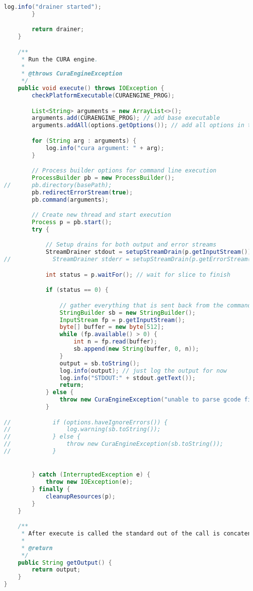 \begin{lstlisting}[language=Java, label={lst:CuraEngine}, caption=CuraEngine.java is the main code that preforms slicing throgh the CuraEngine C++ executable.]
            log.info("drainer started");
        }

        return drainer;
    }

    /**
     * Run the CURA engine.
     *
     * @throws CuraEngineException
     */
    public void execute() throws IOException {
        checkPlatformExecutable(CURAENGINE_PROG);

        List<String> arguments = new ArrayList<>();
        arguments.add(CURAENGINE_PROG); // add base executable
        arguments.addAll(options.getOptions()); // add all options in the correct order

        for (String arg : arguments) {
            log.info("cura argument: " + arg);
        }

        // Process builder options for command line execution
        ProcessBuilder pb = new ProcessBuilder();
//		pb.directory(basePath);
        pb.redirectErrorStream(true);
        pb.command(arguments);

        // Create new thread and start execution
        Process p = pb.start();
        try {

            // Setup drains for both output and error streams
            StreamDrainer stdout = setupStreamDrain(p.getInputStream());
//            StreamDrainer stderr = setupStreamDrain(p.getErrorStream());

            int status = p.waitFor(); // wait for slice to finish

            if (status == 0) {

                // gather everything that is sent back from the command.
                StringBuilder sb = new StringBuilder();
                InputStream fp = p.getInputStream();
                byte[] buffer = new byte[512];
                while (fp.available() > 0) {
                    int n = fp.read(buffer);
                    sb.append(new String(buffer, 0, n));
                }
                output = sb.toString();
                log.info(output); // just log the output for now
                log.info("STDOUT:" + stdout.getText());
                return;
            } else {
                throw new CuraEngineException("unable to parse gcode file");
            }

//            if (options.haveIgnoreErrors()) {
//                log.warning(sb.toString());
//            } else {
//                throw new CuraEngineException(sb.toString());
//            }


        } catch (InterruptedException e) {
            throw new IOException(e);
        } finally {
            cleanupResources(p);
        }
    }

    /**
     * After execute is called the standard out of the call is concatenated into output.
     *
     * @return
     */
    public String getOutput() {
        return output;
    }
}
\end{lstlisting}


